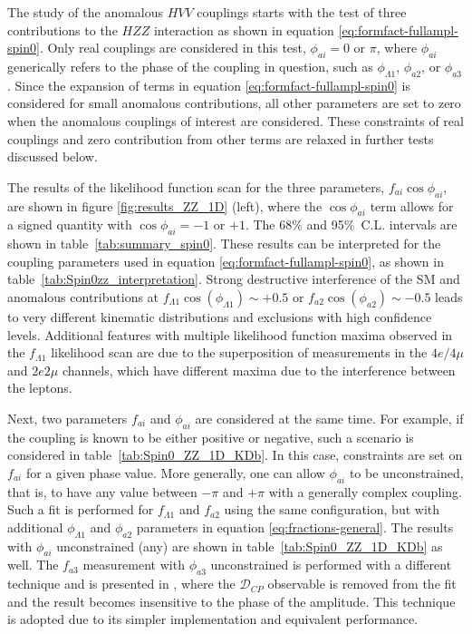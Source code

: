 The study of the anomalous $HVV$ couplings starts with the test of three contributions to the $HZZ$ interaction
as shown in equation \eqref{eq:formfact-fullampl-spin0}. Only real couplings are considered in this test,
$\phi_{ai}=0$ or $\pi$, where $\phi_{ai}$ generically refers to the phase of the coupling in question,
such as $\phi_{\Lambda1}$, $\phi_{a2}$, or $\phi_{a3}$. Since the expansion of terms in equation \eqref{eq:formfact-fullampl-spin0} is considered for small anomalous contributions,
all other parameters are set to zero when the anomalous couplings of interest are considered.
These constraints of real couplings and zero contribution from other terms are relaxed in further tests
discussed below.

The results of the likelihood function scan for the three parameters, $f_{ai}\cos\phi_{ai}$, are shown in
figure \ref{fig:results_ZZ_1D} (left), where the $\cos\phi_{ai}$ term allows for a signed quantity with
$\cos\phi_{ai}=-1$ or $+1$.
The 68\% and 95\%~C.L. intervals are shown in table~\ref{tab:summary_spin0}.
These results can be interpreted for the coupling parameters
used in equation \eqref{eq:formfact-fullampl-spin0}, as shown in table~\ref{tab:Spin0zz_interpretation}.
Strong destructive interference of the SM and anomalous contributions
at $f_{\Lambda1}\cos(\phi_{\Lambda1})\sim+0.5$ or $f_{a2}\cos(\phi_{a2})\sim-0.5$
leads to very different kinematic distributions and exclusions with high confidence levels.
Additional features with multiple likelihood function maxima observed in the $f_{\Lambda1}$ likelihood scan
are due to the superposition of measurements in the $4e/4\mu$ and $2e2\mu$ channels,
which have different maxima due to the interference between the leptons.

Next, two parameters $f_{ai}$ and $\phi_{ai}$ are considered at the same time. For example, if the coupling is known
to be either positive or negative, such a scenario is considered in table~\ref{tab:Spin0_ZZ_1D_KDb}. In this
case, constraints are set on $f_{ai}$ for a given phase value. More generally, one can allow $\phi_{ai}$ to be unconstrained,
that is, to have any value between $-\pi$ and $+\pi$ with a generally complex coupling.
Such a fit is performed for $f_{\Lambda1}$ and $f_{a2}$ using the
same configuration, but with additional $\phi_{\Lambda1}$ and $\phi_{a2}$ parameters in equation \eqref{eq:fractions-general}.
The results with $\phi_{ai}$ unconstrained (any) are shown in table~\ref{tab:Spin0_ZZ_1D_KDb} as well.
The $f_{a3}$ measurement with $\phi_{a3}$ unconstrained is performed with a different technique and is presented
in \cite{Chatrchyan:2013mxa}, where the $\mathcal{D}_{C\!P}$ observable is removed from the fit and the result
becomes insensitive to the phase of the amplitude. This technique is adopted due to its simpler implementation and
equivalent performance.

